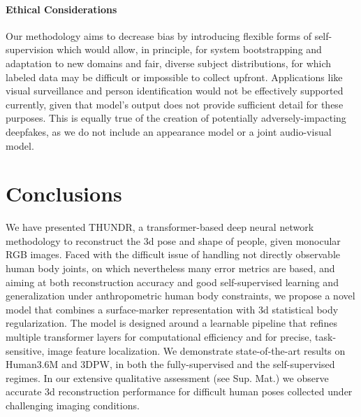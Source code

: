 \documentclass[10pt,twocolumn,letterpaper]{article}
\begin{document}
\paragraph{Ethical Considerations} Our methodology aims to decrease bias by introducing flexible forms of self-supervision which would allow, in principle, for system bootstrapping and adaptation to new domains and fair, diverse subject distributions, for which labeled data may be difficult or impossible to collect upfront. Applications like visual surveillance and person identification would not be effectively supported currently, given that model's output does not provide sufficient detail for these purposes. This is equally true of the creation of potentially adversely-impacting deepfakes, as we do not include an appearance model or a joint audio-visual model.

\section{Conclusions}

We have presented THUNDR, a transformer-based deep neural network methodology to reconstruct the 3d pose and shape of people, given monocular RGB images.  Faced with the difficult issue of handling not directly observable human body joints, on which nevertheless many error metrics are based, and aiming at both reconstruction accuracy and good self-supervised learning and generalization under anthropometric human body constraints, we propose a novel model that combines a surface-marker representation with 3d statistical body regularization. The model is designed around a learnable pipeline that refines multiple transformer layers for computational efficiency and for precise, task-sensitive, image feature localization.
We demonstrate state-of-the-art results on Human3.6M and 3DPW, in both the fully-supervised and the self-supervised regimes. In our extensive qualitative assessment (see Sup. Mat.) we observe  accurate 3d reconstruction performance for difficult human poses collected under challenging imaging conditions.



\clearpage


\end{document}
